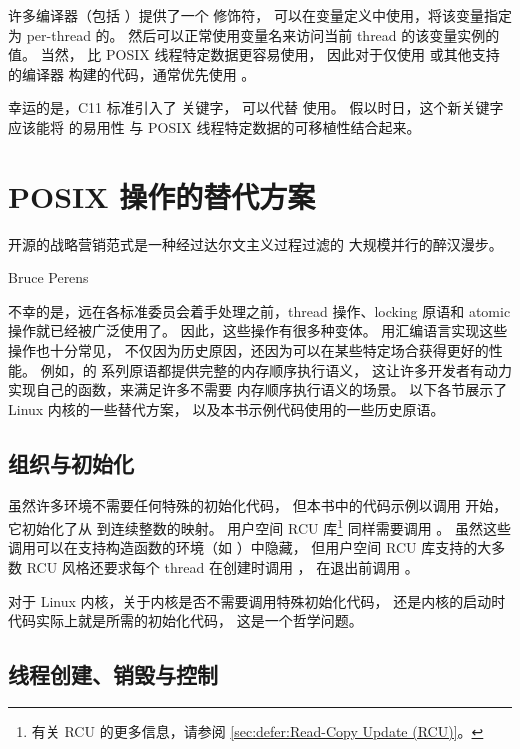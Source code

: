 许多编译器（包括 \GCC）提供了一个  修饰符，
可以在变量定义中使用，将该变量指定为 per-thread 的。
然后可以正常使用变量名来访问当前 thread 的该变量实例的值。
当然， 比 POSIX 线程特定数据更容易使用，
因此对于仅使用 \GCC 或其他支持  的编译器
构建的代码，通常优先使用 。

幸运的是，C11 标准引入了  关键字，
可以代替  使用。
假以时日，这个新关键字应该能将  的易用性
与 POSIX 线程特定数据的可移植性结合起来。

\section{POSIX 操作的替代方案}
\label{sec:toolsoftrade:Alternatives to POSIX Operations}
%
\epigraph{开源的战略营销范式是一种经过达尔文主义过程过滤的
	  大规模并行的醉汉漫步。}
	 {Bruce Perens}

不幸的是，远在各标准委员会着手处理之前，thread 操作、locking 原语和
atomic 操作就已经被广泛使用了。
因此，这些操作有很多种变体。
用汇编语言实现这些操作也十分常见，
不仅因为历史原因，还因为可以在某些特定场合获得更好的性能。
例如，\GCC 的  系列原语都提供完整的内存顺序执行语义，
这让许多开发者有动力实现自己的函数，来满足许多不需要
内存顺序执行语义的场景。
以下各节展示了 Linux 内核的一些替代方案，
以及本书示例代码使用的一些历史原语。

\subsection{组织与初始化}
\label{sec:toolsoftrade:Organization and Initialization}

虽然许多环境不需要任何特殊的初始化代码，
但本书中的代码示例以调用  开始，
它初始化了从  到连续整数的映射。
用户空间 RCU 库\footnote{
	有关 RCU 的更多信息，请参阅
	\cref{sec:defer:Read-Copy Update (RCU)}。}
同样需要调用 。
虽然这些调用可以在支持构造函数的环境（如 \GCC）中隐藏，
但用户空间 RCU 库支持的大多数 RCU 风格还要求每个 thread
在创建时调用 ，
在退出前调用 。

对于 Linux 内核，关于内核是否不需要调用特殊初始化代码，
还是内核的启动时代码实际上就是所需的初始化代码，
这是一个哲学问题。

\subsection{线程创建、销毁与控制}
\label{sec:toolsoftrade:Thread Creation; Destruction; and Control}

